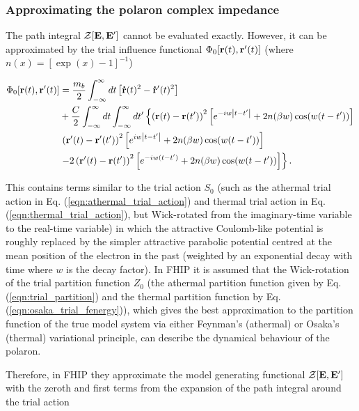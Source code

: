 \subsubsection{Approximating the polaron complex impedance}
\label{subsubsec:2-3-1-1}

The path integral $\mathcal{Z}[\vb{E}, \vb{E'}]$ cannot be evaluated exactly. However, it can be approximated by the trial influence functional $\Phi_0[\vb{r}(t), \vb{r'}(t)]$ (where $n(x) = [\exp(x) - 1]^{-1}$)

\begin{equation}
    \begin{aligned}
    \Phi_0[\vb{r}(t), \vb{r'}(t)] &= \frac{m_b}{2} \int^{\infty}_{-\infty} dt  \left[ \vb{\dot{r}}(t)^2 - \vb{\dot{r}'}(t)^2 \right] \\
    &+ \frac{C}{2} \int^{\infty}_{-\infty} dt \int^{\infty}_{-\infty} dt' \left\{  \left(\vb{r}(t) - \vb{r}(t')\right)^2\left[e^{-iw\abs{t-t'}} + 2n(\beta w) \cos(w(t-t')) \right] \right. \\
    &\left. \left(\vb{r'}(t) - \vb{r'}(t')\right)^2\left[e^{iw\abs{t-t'}} + 2n(\beta w) \cos(w(t-t')) \right]  \right. \\
    &\left. - 2 \left(\vb{r'}(t) - \vb{r}(t')\right)^2\left[e^{-iw(t-t')} + 2n(\beta w) \cos(w(t-t')) \right] \right\}.
    \end{aligned}
\end{equation}

This contains terms similar to the trial action $S_0$ (such as the athermal trial action in Eq. (\ref{eqn:athermal_trial_action}) and thermal trial action in Eq. (\ref{eqn:thermal_trial_action}), but Wick-rotated from the imaginary-time variable to the real-time variable) in which the attractive Coulomb-like potential is roughly replaced by the simpler attractive parabolic potential centred at the mean position of the electron in the past (weighted by an exponential decay with time where $w$ is the decay factor). In FHIP it is assumed that the Wick-rotation of the trial partition function $Z_0$ (the athermal partition function given by Eq. (\ref{eqn:trial_partition}) and the thermal partition function by Eq. (\ref{eqn:osaka_trial_fenergy})), which gives the best approximation to the partition function of the true model system via either Feynman's (athermal) or Osaka's (thermal) variational principle, can describe the dynamical behaviour of the polaron. 

Therefore, in FHIP they approximate the model generating functional $\mathcal{Z[\vb{E}, \vb{E'}]}$ with the zeroth and first terms from the expansion of the path integral around the trial action

